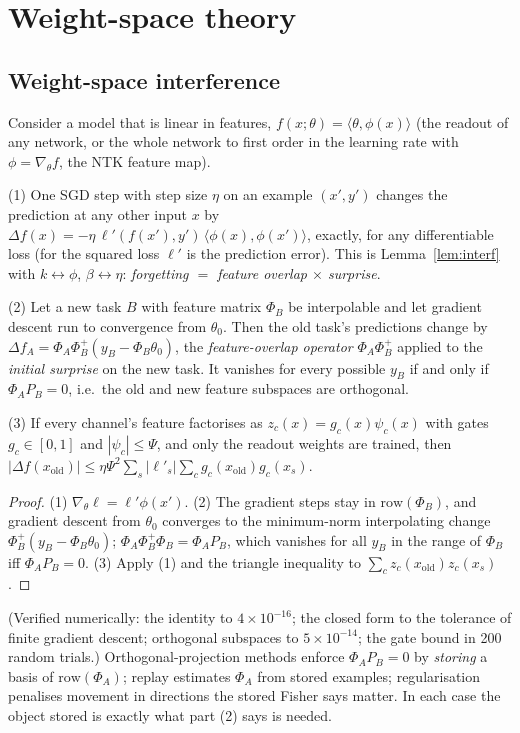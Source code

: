 \section{Weight-space theory}\label{app:weighttheory}
\subsection{Weight-space interference}
Consider a model that is linear in features, $f(x;\theta)=\langle\theta,\phi(x)\rangle$ (the readout of any network, or the whole network to first order in the learning rate with $\phi=\nabla_\theta f$, the NTK feature map).
\begin{proposition}\label{prop:wspace}
(1) One SGD step with step size $\eta$ on an example $(x',y')$ changes the prediction at any other input $x$ by $\Delta f(x)=-\eta\,\ell'(f(x'),y')\,\langle\phi(x),\phi(x')\rangle$, exactly, for any differentiable loss (for the squared loss $\ell'$ is the prediction error). This is Lemma~\ref{lem:interf} with $k\leftrightarrow\phi$, $\beta\leftrightarrow\eta$: \emph{forgetting $=$ feature overlap $\times$ surprise}.

(2) Let a new task $B$ with feature matrix $\Phi_B$ be interpolable and let gradient descent run to convergence from $\theta_0$. Then the old task's predictions change by $\Delta f_A=\Phi_A\Phi_B^{+}(y_B-\Phi_B\theta_0)$, the \emph{feature-overlap operator} $\Phi_A\Phi_B^{+}$ applied to the \emph{initial surprise} on the new task. It vanishes for every possible $y_B$ if and only if $\Phi_AP_B=0$, i.e.\ the old and new feature subspaces are orthogonal.

(3) If every channel's feature factorises as $z_c(x)=g_c(x)\psi_c(x)$ with gates $g_c\in[0,1]$ and $|\psi_c|\le\Psi$, and only the readout weights are trained, then $|\Delta f(x_{\mathrm{old}})|\le\eta\Psi^2\sum_s|\ell'_s|\sum_cg_c(x_{\mathrm{old}})g_c(x_s)$.
\end{proposition}
\begin{proof}
(1) $\nabla_\theta\ell=\ell'\phi(x')$. (2) The gradient steps stay in $\mathrm{row}(\Phi_B)$, and gradient descent from $\theta_0$ converges to the minimum-norm interpolating change $\Phi_B^{+}(y_B-\Phi_B\theta_0)$; $\Phi_A\Phi_B^{+}\Phi_B=\Phi_AP_B$, which vanishes for all $y_B$ in the range of $\Phi_B$ iff $\Phi_AP_B=0$. (3) Apply (1) and the triangle inequality to $\sum_cz_c(x_{\mathrm{old}})z_c(x_s)$.
\end{proof}
(Verified numerically: the identity to $4\times10^{-16}$; the closed form to the tolerance of finite gradient descent; orthogonal subspaces to $5\times10^{-14}$; the gate bound in 200 random trials.) Orthogonal-projection methods enforce $\Phi_AP_B=0$ by \emph{storing} a basis of $\mathrm{row}(\Phi_A)$; replay estimates $\Phi_A$ from stored examples; regularisation penalises movement in directions the stored Fisher says matter. In each case the object stored is exactly what part (2) says is needed.


